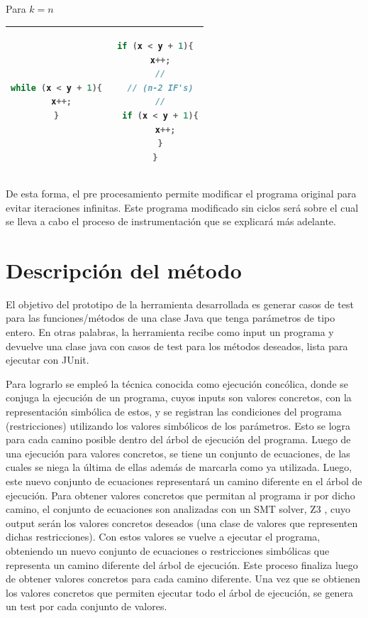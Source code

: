 \documentclass{llncs}
\begin{document}
Para \(k = n\)
\begin{table}
\centering
\begin{tabular}{|c | c|}
\hline
\begin{lstlisting}[language=Java]
while (x < y + 1){
  x++;
}
\end{lstlisting} & 
\begin{lstlisting}[language=Java]
if (x < y + 1){
  x++;
  //
  // (n-2 IF's)
  //
  if (x < y + 1){
    x++;
  }
}
\end{lstlisting}\\
\hline
\end{tabular}
\end{table}

De esta forma, el pre procesamiento permite modificar el programa original para evitar iteraciones infinitas.
Este programa modificado sin ciclos será sobre el cual se lleva a cabo el proceso de instrumentación que se explicará más adelante.


\section{Descripción del método}
El objetivo del prototipo de la herramienta desarrollada es generar casos de test para las funciones/métodos de una clase Java que tenga parámetros de tipo
entero. En otras palabras, la herramienta recibe como input un programa y devuelve una clase java con casos de test para los métodos deseados,
lista para ejecutar con JUnit.

Para lograrlo se empleó la técnica conocida como ejecución concólica, donde se conjuga la ejecución de un programa, cuyos inputs son valores concretos,
con la representación simbólica de estos, y se registran las condiciones del programa (restricciones) utilizando los valores simbólicos de los parámetros.
Esto se logra para cada camino posible dentro del árbol de ejecución del programa. Luego de una ejecución para valores concretos, se tiene un conjunto de
ecuaciones, de las cuales se niega la última de ellas además de marcarla como ya utilizada. Luego, este nuevo conjunto de ecuaciones representará un camino
diferente en el árbol de ejecución. Para obtener valores concretos que permitan al programa ir por dicho camino, el conjunto de ecuaciones son analizadas
con un SMT solver, Z3 \cite{z3solver}, cuyo output serán los valores concretos deseados (una clase de valores que representen dichas restricciones). Con estos valores se
vuelve a ejecutar el programa, obteniendo un nuevo conjunto de ecuaciones o restricciones simbólicas que representa un camino diferente del árbol de ejecución.
Este proceso finaliza luego de obtener valores concretos para cada camino diferente. Una vez que se obtienen los valores concretos que permiten ejecutar todo el
árbol de ejecución, se genera un test por cada conjunto de valores.
\end{document}
